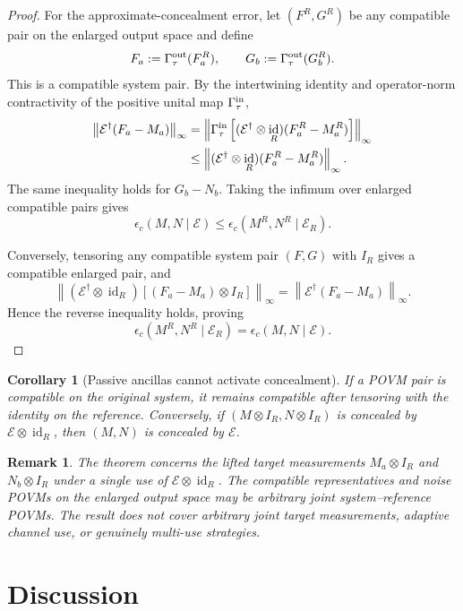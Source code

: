 \documentclass[
aps,pra,twocolumn,10pt,
superscriptaddress,longbibliography,floatfix
]{revtex4-2}
\DeclareMathOperator{\id}{id}
\newtheorem{corollary}[theorem]{Corollary}
\newtheorem{remark}[theorem]{Remark}
\begin{document}
\begin{proof}
For the approximate-concealment error, let $(F^R,G^R)$ be any compatible pair on the enlarged output space and define
\[
F_a:=\Gamma_\tau^{\rm out}(F_a^R),
\qquad
G_b:=\Gamma_\tau^{\rm out}(G_b^R).
\]
This is a compatible system pair. By the intertwining identity and operator-norm contractivity of the positive unital map $\Gamma_\tau^{\rm in}$,
\begin{align*}
\left\|
\mathcal E^\dagger(F_a-M_a)
\right\|_\infty
&=
\left\|
\Gamma_\tau^{\rm in}
\left[
(\mathcal E^\dagger\otimes\id_R)
(F_a^R-M_a^R)
\right]
\right\|_\infty\\
&\le
\left\|
(\mathcal E^\dagger\otimes\id_R)
(F_a^R-M_a^R)
\right\|_\infty .
\end{align*}
The same inequality holds for $G_b-N_b$. Taking the infimum over enlarged compatible pairs gives
\[
\epsilon_c(M,N\mid\mathcal E)
\le
\epsilon_c(M^R,N^R\mid\mathcal E_R).
\]

Conversely, tensoring any compatible system pair $(F,G)$ with $I_R$ gives a compatible enlarged pair, and
\[
\left\|
(\mathcal E^\dagger\otimes\id_R)
[(F_a-M_a)\otimes I_R]
\right\|_\infty
=
\left\|
\mathcal E^\dagger(F_a-M_a)
\right\|_\infty .
\]
Hence the reverse inequality holds, proving
\[
\epsilon_c(M^R,N^R\mid\mathcal E_R)
=
\epsilon_c(M,N\mid\mathcal E).
\]
\end{proof}

\begin{corollary}[Passive ancillas cannot activate concealment]
If a POVM pair is compatible on the original system, it remains compatible after tensoring with the identity on the reference. Conversely, if $(M\otimes I_R,N\otimes I_R)$ is concealed by $\mathcal E\otimes\id_R$, then $(M,N)$ is concealed by $\mathcal E$.
\end{corollary}

\begin{remark}
The theorem concerns the lifted target measurements $M_a\otimes I_R$ and $N_b\otimes I_R$ under a single use of $\mathcal E\otimes\id_R$. The compatible representatives and noise POVMs on the enlarged output space may be arbitrary joint system--reference POVMs. The result does not cover arbitrary joint target measurements, adaptive channel use, or genuinely multi-use strategies.
\end{remark}

\section{Discussion}
\label{sec:discussion}
\end{document}

